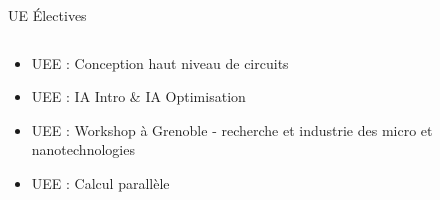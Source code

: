 \documentclass[t,compress,mathserif,12pt,xcolor=dvipsnames]{beamer}
\begin{document}
\begin{frame}[t]{UE \'Electives}
  \begin{minipage}[t][5.0cm][t]{\textwidth}
    \begin{columns}[T]
      \begin{column}{0.63\textwidth}
        \begin{itemize}
            \item<+-> UEE : Conception haut niveau de circuits
            \item<+-> UEE : IA Intro \& IA Optimisation
            \item<+-> UEE : Workshop à Grenoble - recherche et industrie des micro et nanotechnologies
            \item<+-> UEE : Calcul parallèle
        \end{itemize}
      \end{column}
      \begin{column}{0.04\textwidth}


\end{column}
\end{columns}
\end{minipage}
\end{frame}
\end{document}
